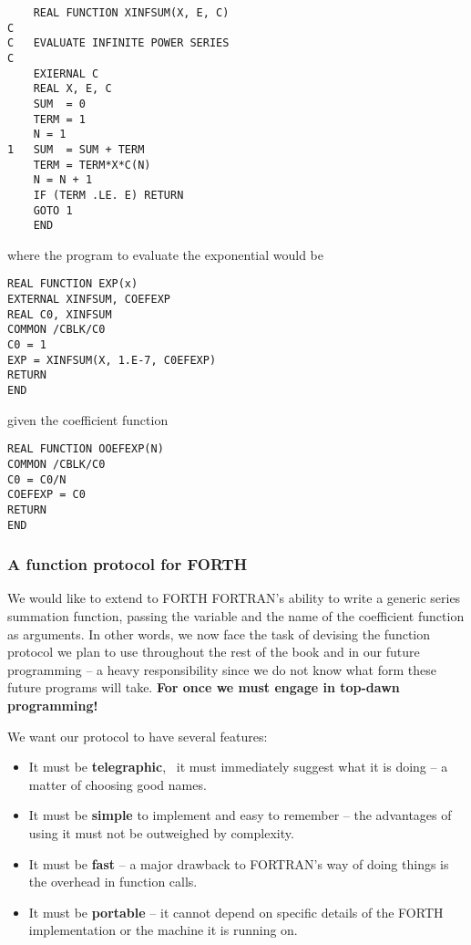 \begin{lstlisting}
    REAL FUNCTION XINFSUM(X, E, C)
C
C   EVALUATE INFINITE POWER SERIES
C
    EXIERNAL C
    REAL X, E, C
    SUM  = 0
    TERM = 1
    N = 1
1   SUM  = SUM + TERM
    TERM = TERM*X*C(N)
    N = N + 1
    IF (TERM .LE. E) RETURN
    GOTO 1
    END
\end{lstlisting}

where the program to evaluate the exponential would be

\begin{lstlisting}
REAL FUNCTION EXP(x)
EXTERNAL XINFSUM, COEFEXP
REAL C0, XINFSUM
COMMON /CBLK/C0
C0 = 1
EXP = XINFSUM(X, 1.E-7, C0EFEXP)
RETURN
END
\end{lstlisting}

given the coefficient function

\begin{lstlisting}
REAL FUNCTION OOEFEXP(N)
COMMON /CBLK/C0
C0 = C0/N
COEFEXP = C0
RETURN
END
\end{lstlisting}

\subsubsection{A function protocol for FORTH}

We would like to extend to FORTH FORTRAN's ability to write a generic series summation function, passing the variable and the name of the coefficient function as arguments. In other words, we now face the task of devising the function protocol we plan to use throughout the rest of the book and in our future programming -- a heavy responsibility since we do not know what form these future programs will take. \textbf{For once we must engage in top-dawn programming!}

We want our protocol to have several features:
\begin{itemize}
    \item It must be \textbf{telegraphic}, \ie\ it must immediately suggest what it is doing -- a matter of choosing good names.
    \item It must be \textbf{simple} to implement and easy to remember -- the advantages of using it must not be outweighed by complexity.
    \item It must be \textbf{fast} -- a major drawback to FORTRAN's way of doing things is the overhead in function calls.
    \item It must be \textbf{portable} -- it cannot depend on specific details of the FORTH implementation or the machine it is running on.
\end{itemize}

